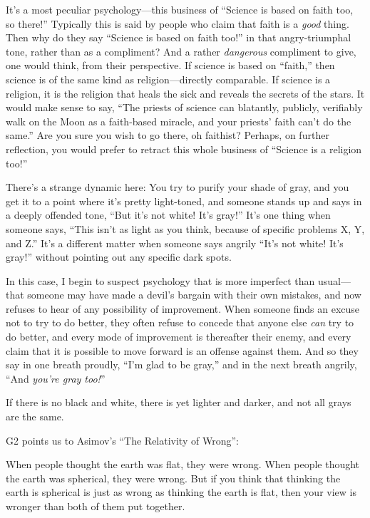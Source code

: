 {
 It's a most peculiar psychology---this business of
``Science is based on faith too, so
there!'' Typically this is said by people who claim
that faith is a \textit{good} thing. Then why do they say
``Science is based on faith too!''
in that angry-triumphal tone, rather than as a compliment? And a rather
\textit{dangerous} compliment to give, one would think, from their
perspective. If science is based on
``faith,'' then science is of the
same kind as religion---directly comparable. If science is a religion,
it is the religion that heals the sick and reveals the secrets of the
stars. It would make sense to say, ``The priests of
science can blatantly, publicly, verifiably walk on the Moon as a
faith-based miracle, and your priests' faith
can't do the same.'' Are you sure you
wish to go there, oh faithist? Perhaps, on further reflection, you
would prefer to retract this whole business of
``Science is a religion too!''}

{
 There's a strange dynamic here: You try to purify
your shade of gray, and you get it to a point where
it's pretty light-toned, and someone stands up and says
in a deeply offended tone, ``But it's
not white! It's gray!''
It's one thing when someone says,
``This isn't as light as you think,
because of specific problems X, Y, and Z.''
It's a different matter when someone says angrily
``It's not white! It's
gray!'' without pointing out any specific dark
spots.}

{
 In this case, I begin to suspect psychology that is more imperfect
than usual---that someone may have made a devil's
bargain with their own mistakes, and now refuses to hear of any
possibility of improvement. When someone finds an excuse not to try to
do better, they often refuse to concede that anyone else \textit{can}
try to do better, and every mode of improvement is thereafter their
enemy, and every claim that it is possible to move forward is an
offense against them. And so they say in one breath proudly,
``I'm glad to be
gray,'' and in the next breath angrily,
``And \textit{you're gray
too!}''}

{
 If there is no black and white, there is yet lighter and darker,
and not all grays are the same.}

{
 G2 points us to Asimov's ``The
Relativity of Wrong'':}

{
 When people thought the earth was flat, they were wrong. When
people thought the earth was spherical, they were wrong. But if you
think that thinking the earth is spherical is just as wrong as thinking
the earth is flat, then your view is wronger than both of them put
together.}

